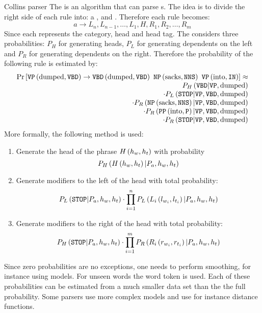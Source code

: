 \begin{df}{Collins parser}
The \sb{} is an algorithm that can parse s. The idea is to divide the right side of each rule into: a ,  and . Therefore each rule becomes:
\begin{equation}
a\rightarrow L_n, L_{n-1},\ldots,L_1,H,R_1,R_2,\ldots,R_m
\end{equation}
Since each  represents the category, head and head tag. The \sb{} considers three probabilities: $P_H$ for generating heads, $P_L$ for generating dependents on the left and $P_R$ for generating dependents on the right. Therefore the probability of the following rule is estimated by:
\begin{equation}
\begin{array}{r}
\Prob{\fun{\tagref{VP}}{\mbox{dumped},\tagref{VBD}}\rightarrow\fun{\tagref{VBD}}{\mbox{dumped},\tagref{VBD}}\ \fun{\tagref{NP}}{\mbox{sacks},\tagref{NNS}}\ \fun{\tagref{VP}}{\mbox{into},\tagref{IN}}}\approx\\
\fun{P_H}{\tagref{VBD}|\tagref{VP},\mbox{dumped}}\\\cdot\fun{P_L}{\tagref{STOP}|\tagref{VP},\tagref{VBD},\mbox{dumped}}\\\cdot\fun{P_R}{\fun{\tagref{NP}}{\mbox{sacks},\tagref{NNS}}|\tagref{VP},\tagref{VBD},\mbox{dumped}}\\\cdot\fun{P_R}{\fun{\tagref{PP}}{\mbox{into},\tagref{P}}|\tagref{VP},\tagref{VBD},\mbox{dumped}}\\\cdot\fun{P_R}{\tagref{STOP}|\tagref{VP},\tagref{VBD},\mbox{dumped}}
\end{array}
\end{equation}
More formally, the following method is used:
\begin{enumerate}
 \item Generate the head of the phrase $H\left(h_w,h_t\right)$ with probability
 \begin{equation}
  P_H\left(H\left(h_w,h_t\right)|P_a,h_w,h_t\right)
 \end{equation}
 \item Generate modifiers to the left of the head with total probability:
 \begin{equation}
  P_L\left(\mbox{\texttt{STOP}}|P_a,h_w,h_t\right)\cdot\displaystyle\prod_{i=1}^nP_L\left(L_i\left(l_{w_i},l_{t_i}\right)|P_a,h_w,h_t\right)
 \end{equation}
 \item Generate modifiers to the right of the head with total probability:
 \begin{equation}
  P_H\left(\mbox{\texttt{STOP}}|P_a,h_w,h_t\right)\cdot\displaystyle\prod_{i=1}^mP_R\left(R_i\left(r_{w_i},r_{t_i}\right)|P_a,h_w,h_t\right)
 \end{equation}
\end{enumerate}
Since zero probabilities are no exceptions, one needs to perform smoothing, for instance using  models. For unseen words the  word token is used. Each of these probabilities can be estimated from a much smaller data set than the the full probability. Some parsers use more complex models and use for instance distance functions.
\end{df}
